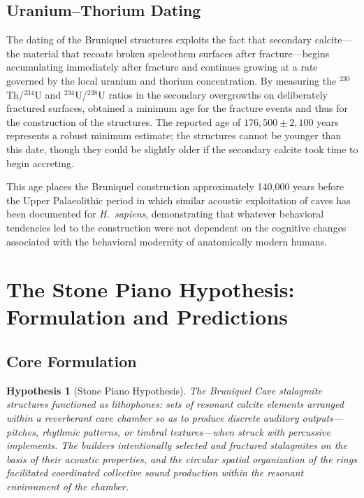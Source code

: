 \documentclass[12pt]{article}
\newtheorem{hypothesis}{Hypothesis}
\begin{document}
\subsection{Uranium--Thorium Dating}

The dating of the Bruniquel structures exploits the fact that secondary calcite—the material that recoats broken speleothem surfaces after fracture—begins accumulating immediately after fracture and continues growing at a rate governed by the local uranium and thorium concentration. By measuring the $^{230}$Th/$^{234}$U and $^{234}$U/$^{238}$U ratios in the secondary overgrowths on deliberately fractured surfaces, \citet{Jaubert2016} obtained a minimum age for the fracture events and thus for the construction of the structures. The reported age of $176{,}500 \pm 2{,}100$ years represents a robust minimum estimate; the structures cannot be younger than this date, though they could be slightly older if the secondary calcite took time to begin accreting.

This age places the Bruniquel construction approximately 140,000 years before the Upper Palaeolithic period in which similar acoustic exploitation of caves has been documented for \textit{H.\ sapiens}, demonstrating that whatever behavioral tendencies led to the construction were not dependent on the cognitive changes associated with the behavioral modernity of anatomically modern humans.

\section{The Stone Piano Hypothesis: Formulation and Predictions}

\subsection{Core Formulation}

\begin{hypothesis}[Stone Piano Hypothesis]
The Bruniquel Cave stalagmite structures functioned as lithophones: sets of resonant calcite elements arranged within a reverberant cave chamber so as to produce discrete auditory outputs—pitches, rhythmic patterns, or timbral textures—when struck with percussive implements. The builders intentionally selected and fractured stalagmites on the basis of their acoustic properties, and the circular spatial organization of the rings facilitated coordinated collective sound production within the resonant environment of the chamber.
\end{hypothesis}
\end{document}
